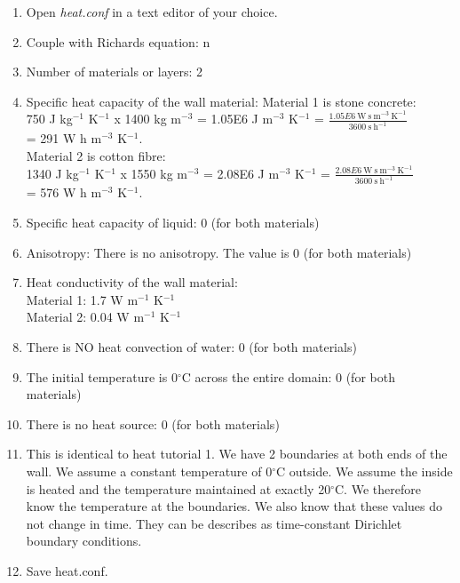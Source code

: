 \begin{enumerate}
\item Open \emph{heat.conf} in a text editor of your choice. 
\item Couple with Richards equation: n
\item Number of materials or layers: 2
\item Specific heat capacity of the wall material: 
Material 1 is stone concrete: \\750 J kg$^{-1}$ K$^{-1}$ x 1400 kg m$^{-3}$ = 1.05E6 J m$^{-3}$ K$^{-1}$ = $\frac{1.05E6~\mathrm{W~s~m^{-3}~K^{-1}}}{3600~\mathrm{s~h^{-1}}}$ \\= 291 W h m$^{-3}$ K$^{-1}$. \\
Material 2 is cotton fibre: \\1340 J kg$^{-1}$ K$^{-1}$ x 1550 kg m$^{-3}$ = 2.08E6 J m$^{-3}$ K$^{-1}$ = $\frac{2.08E6~\mathrm{W~s~m^{-3}~K^{-1}}}{3600~\mathrm{s~h^{-1}}}$ \\= 576 W h m$^{-3}$ K$^{-1}$. 
\item Specific heat capacity of liquid: 0 (for both materials)
\item Anisotropy: There is no anisotropy. The value is 0 (for both materials)
\item Heat conductivity of the wall material: \\ Material 1: 1.7 W m$^{-1}$ K$^{-1}$ \\ Material 2: 0.04 W m$^{-1}$ K$^{-1}$
\item There is NO heat convection of water: 0 (for both materials)
\item The initial temperature is 0$^{\circ}$C across the entire domain: 0 (for both materials)
\item There is no heat source: 0 (for both materials)
\item This is identical to heat tutorial 1. We have 2 boundaries at both ends of the wall. We assume a constant temperature of 0$^{\circ}$C outside. We assume the inside is heated and the temperature maintained at exactly 20$^{\circ}$C. We therefore know the temperature at the boundaries. We also know that these values do not change in time. They can be describes as time-constant Dirichlet boundary conditions. \\

\item Save heat.conf.
\end{enumerate}

